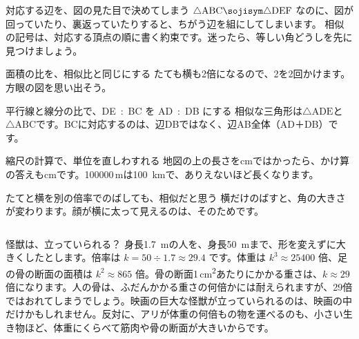 
\begin{tsumazuki}{対応する辺を、図の見た目で決めてしまう}
$\triangle\mathrm{ABC}\sojisym\triangle\mathrm{DEF}$ なのに、図が回っていたり、裏返っていたりすると、ちがう辺を組にしてしまいます。
相似の記号は、対応する頂点の順に書く約束です。迷ったら、等しい角どうしを先に見つけましょう。
\end{tsumazuki}

\begin{tsumazuki}{面積の比を、相似比と同じにする}
たても横も2倍になるので、2を2回かけます。方眼の図を思い出そう。
\end{tsumazuki}

\begin{tsumazuki}{平行線と線分の比で、\mbox{DE : BC} を \mbox{AD : DB} にする}
相似な三角形は$\triangle\mathrm{ADE}$と$\triangle\mathrm{ABC}$です。BCに対応するのは、辺DBではなく、辺AB全体（AD＋DB）です。
\end{tsumazuki}

\begin{tsumazuki}{縮尺の計算で、単位を直しわすれる}
地図の上の長さをcmではかったら、かけ算の答えもcmです。\num{100000}\,mは\qty{100}{km}で、ありえないほど長くなります。
\end{tsumazuki}

\begin{tsumazuki}{たてと横を別の倍率でのばしても、相似だと思う}
横だけのばすと、角の大きさが変わります。顔が横に太って見えるのは、そのためです。
\end{tsumazuki}

\begin{column}{怪獣は、立っていられる？}
身長\qty{1.7}{m}の人を、身長\qty{50}{m}まで、形を変えずに大きくしたとします。倍率は $k=50\div1.7\approx29.4$ です。体重は $k^3\approx\num{25400}$ 倍、足の骨の断面の面積は $k^2\approx865$ 倍。骨の断面1\,\unit{cm^2}あたりにかかる重さは、$k\approx29$ 倍になります。人の骨は、ふだんかかる重さの何倍かには耐えられますが、29倍ではおれてしまうでしょう。映画の巨大な怪獣が立っていられるのは、映画の中だけかもしれません。反対に、アリが体重の何倍もの物を運べるのも、小さい生き物ほど、体重にくらべて筋肉や骨の断面が大きいからです。
\end{column}

